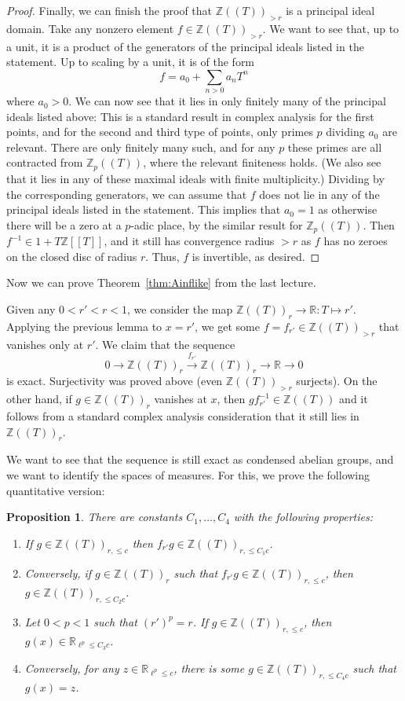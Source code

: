 \documentclass[11pt]{amsbook}
\numberwithin{equation}{section}
\numberwithin{theorem}{section}
\newtheorem{proposition}[theorem]{Proposition}
\theoremstyle{definition}
\begin{document}
\begin{proof}
Finally, we can finish the proof that $\mathbb Z((T))_{>r}$ is a principal ideal domain. Take any nonzero element $f\in \mathbb Z((T))_{>r}$. We want to see that, up to a unit, it is a product of the generators of the principal ideals listed in the statement. Up to scaling by a unit, it is of the form
\[
f= a_0+\sum_{n>0} a_n T^n
\]
where $a_0>0$. We can now see that it lies in only finitely many of the principal ideals listed above: This is a standard result in complex analysis for the first points, and for the second and third type of points, only primes $p$ dividing $a_0$ are relevant. There are only finitely many such, and for any $p$ these primes are all contracted from $\mathbb Z_p((T))$, where the relevant finiteness holds. (We also see that it lies in any of these maximal ideals with finite multiplicity.) Dividing by the corresponding generators, we can assume that $f$ does not lie in any of the principal ideals listed in the statement. This implies that $a_0=1$ as otherwise there will be a zero at a $p$-adic place, by the similar result for $\mathbb Z_p((T))$. Then $f^{-1}\in 1+T\mathbb Z[[T]]$, and it still has convergence radius $>r$ as $f$ has no zeroes on the closed disc of radius $r$. Thus, $f$ is invertible, as desired.
\end{proof}

Now we can prove Theorem~\ref{thm:Ainflike} from the last lecture.

Given any $0<r'<r<1$, we consider the map $\mathbb Z((T))_r\to \mathbb R: T\mapsto r'$. Applying the previous lemma to $x=r'$, we get some $f=f_{r'}\in \mathbb Z((T))_{>r}$ that vanishes only at $r'$. We claim that the sequence
\[
0\to \mathbb Z((T))_r\xrightarrow{f_{r'}} \mathbb Z((T))_r\to \mathbb R\to 0
\]
is exact. Surjectivity was proved above (even $\mathbb Z((T))_{>r}$ surjects). On the other hand, if $g\in \mathbb Z((T))_r$ vanishes at $x$, then $gf_{r'}^{-1}\in \mathbb Z((T))$ and it follows from a standard complex analysis consideration that it still lies in $\mathbb Z((T))_r$.

We want to see that the sequence is still exact as condensed abelian groups, and we want to identify the spaces of measures. For this, we prove the following quantitative version:

\begin{proposition} There are constants $C_1,\ldots,C_4$ with the following properties:
\begin{enumerate}
\item If $g\in \mathbb Z((T))_{r,\leq c}$ then $f_{r'}g\in \mathbb Z((T))_{r,\leq C_1c}$.
\item Conversely, if $g\in \mathbb Z((T))_r$ such that $f_{r'}g\in \mathbb Z((T))_{r,\leq c}$, then $g\in \mathbb Z((T))_{r,\leq C_2c}$.
\item Let $0<p<1$ such that $(r')^p=r$. If $g\in \mathbb Z((T))_{r,\leq c}$, then $g(x)\in \mathbb R_{\ell^p\leq C_3c}$.
\item Conversely, for any $z\in \mathbb R_{\ell^p\leq c}$, there is some $g\in \mathbb Z((T))_{r,\leq C_4c}$ such that $g(x)=z$.
\end{enumerate}
\end{proposition}
\end{document}
